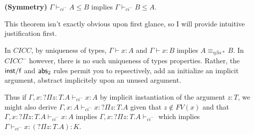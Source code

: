 \begin{theorem}
\textbf{(Symmetry)}
$\Gamma \vdash_{ci^-} A \leq B $ implies 
$\Gamma \vdash_{ci^-} B \leq A $.
\label{ci:sym}
\end{theorem}


This theorem isn't exactly obvious upon first glance, 
so I will provide intuitive justification first.

In $CICC$, by uniqueness of types, 
$\Gamma \vdash x : A$ and 
$\Gamma \vdash x : B$ implies
$A \equiv_{\eta\beta\alpha*} B$.  
In $CICC^{-}$ however, there is no such uniqueness of 
types properties.  
Rather, the $\mathsf{inst/f}$ and $\mathsf{abs}_2$ 
rules permit you to repsectively,
add an initialize an implicit argument, 
abstract implicitely upon an unused argument. 

Thus if $\Gamma , x : ?\Pi z : T . A \vdash_{ci^-} x : A$
by implicit instantiation of the argument $z:T$,
we might also
derive
$\Gamma , x : A \vdash_{ci^-} x : ?\Pi z : T . A$
given that $z \notin FV(x)$ and that 
$\Gamma , x : ?\Pi z : T . A \vdash_{ci^-} x : A$ 
implies $ \Gamma , x : ?\Pi z : T . A \vdash_{ci^-}$ 
which implies $ \Gamma\vdash_{ci^-} x : (?\Pi z : T . A) : K$.
\begin{comment}
-------------------------- Id/x
G, z : T , x : A |- x : A        G |- ?[z:T]A : K   z notin FV(x)
----------------------------------------------------------------- abs_2
G , x : A |- x : ?[z : T ] A


G |- M : ?[x:T]U   G |- N : T
------------------------------ inst/f
 G |- M : [N/x] U



\end{comment}

\begin{comment}

CASE ABS2: 

G,x:A, z : T |- x : B      G |- ?[z:T]B : K      z notin FV(x)\cup FV(G,x:A) 
--------------------------------------------------------------------abs_2
            G, x : A |- x : ?[z:T] B
 
                                     G |- ?[z:T] B : K                 
                                   -------------------- weak         ----------
                                   G,z:T |- ?[z:T]B : K              G |- T : K
                            ------------------------------- id    -------------- id
then                         G,z:T, x : ?[z:T]B |- x : ?[z:T]B    G,z:T |- z : T
     I.H.                   -----------------------------------------------------  inst/f
G,z:T, x : B |- x : A              G, z : T , x : ?[z:T] B |- x : B
--------------------------------------------------------------------  subst
  G, z:T, x : ?[z:T] B |- x : A    since x notin FV(A)
  ----------------------------------------------------- strength
            G, x : ?[z:T] B |- x : A            

\end{comment}


